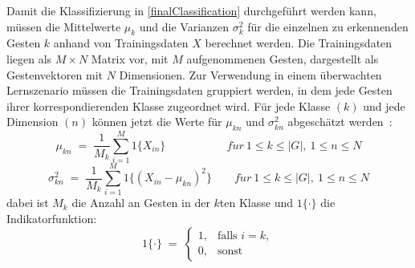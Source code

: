 Damit die Klassifizierung in \eqref{finalClassification} durchgeführt werden kann, müssen die Mittelwerte $\mu_k$ und die Varianzen $\sigma^2_k$ für die einzelnen zu erkennenden Gesten $k$ anhand von Trainingsdaten $X$ berechnet werden. Die Trainingsdaten liegen als $M\times N$ Matrix vor, mit $M$ aufgenommenen Gesten, dargestellt als Gestenvektoren mit $N$ Dimensionen. Zur Verwendung in einem überwachten Lernszenario müssen die Trainingsdaten gruppiert werden, in dem jede Gesten ihrer korrespondierenden Klasse zugeordnet wird. Für jede Klasse $(k)$ und jede Dimension $(n)$ können jetzt die Werte für $\mu_{kn}$ und $\sigma^2_{kn}$ abgeschätzt werden~\cite{gillianANBC}:
\begin{equation}
    \mu_{kn} \; = \; \frac{1}{M_k} \sum_{i=1}^M 1{\{X_{in}}\} \qquad \qquad \quad \ \ 
    f\ddot{u}r \ 1\leq k \leq |G|,\ 1\leq n\leq N
\end{equation}
\begin{equation}
    \sigma_{kn}^2 \; = \; \frac{1}{M_k} \sum_{i=1}^M 1{\{(X_{in} - \mu_{kn})^2}\} \qquad 
    f\ddot{u}r \ 1\leq k \leq |G|,\ 1\leq n\leq N
\end{equation}
dabei ist $M_k$ die Anzahl an Gesten in der $k$ten Klasse und $1\{\cdot\}$ die Indikatorfunktion:
\begin{equation}
    1\{\cdot\} \; = \; \begin{cases}
                            1,&{\text{falls }}i=k,\\0,&{\text{sonst}}
                       \end{cases}
\end{equation}
 